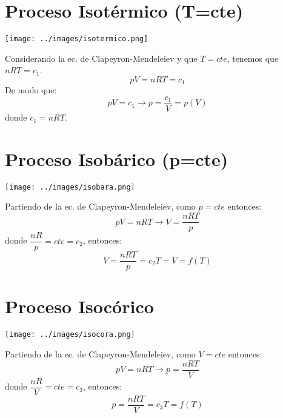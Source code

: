 \documentclass[../main]{subfiles}
\begin{document}
\section{Proceso Isotérmico (T=cte)}

\begin{minipage}{0.49\textwidth}
    \texttt{[image: ../images/isotermico.png]}
\end{minipage}
\begin{minipage}{0.49\textwidth}
    Considerando la ec. de Clapeyron-Mendeleiev y que $T=cte$, tenemos que $nRT=c_1$.
    \begin{equation*}
        pV=nRT=c_1
    \end{equation*}
    De modo que:
    \begin{equation}
        pV=c_1 \rightarrow p=\dfrac{c_1}{V}=p(V)
    \end{equation}
    donde $c_1=nRT$.
\end{minipage}

\section{Proceso Isobárico (p=cte)}

\begin{minipage}{0.49\textwidth}
    \texttt{[image: ../images/isobara.png]}
\end{minipage}
\begin{minipage}{0.49\textwidth}
    Partiendo de la ec. de Clapeyron-Mendeleiev, como $p=cte$ entonces:
    \begin{equation*}
        pV=nRT \rightarrow V=\dfrac{nRT}{p}
    \end{equation*}
    donde $\dfrac{nR}{p}=cte=c_2$, entonces:
    \begin{equation*}
        V=\dfrac{nRT}{p}=c_2 T=V=f(T)
    \end{equation*}
\end{minipage}

\section{Proceso Isocórico}
\begin{minipage}{0.49\textwidth}
    \texttt{[image: ../images/isocora.png]}
\end{minipage}
\begin{minipage}{0.49\textwidth}
    Partiendo de la ec. de Clapeyron-Mendeleiev, como $V=cte$ entonces:
    \begin{equation*}
        pV=nRT \rightarrow p=\dfrac{nRT}{V}
    \end{equation*}
    donde $\dfrac{nR}{V}=cte=c_3$, entonces:
    \begin{equation*}
        p=\dfrac{nRT}{V}=c_3 T=f(T)
    \end{equation*}
\end{minipage}
\end{document}
